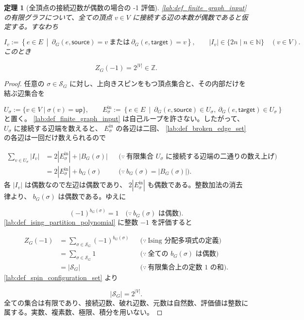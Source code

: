 \documentclass[11pt,a4paper]{article}
\newtheorem{theorem}[definition]{定理}
\theoremstyle{remark}
\begin{document}
\begin{theorem}[全頂点の接続辺数が偶数の場合の -1 評価]\label{lab:theorem_even_incident_edge_counts_evaluation_minus_one}
\cref{lab:def_finite_graph_input}
 の有限グラフについて、全ての頂点 
$v\in V$
 に接続する辺の本数が偶数であると仮定する。すなわち

\[I_v:=\left\{e\in E\ \middle|\ \partial_G(e,\mathsf{source})=v\ \text{または}\ \partial_G(e,\mathsf{target})=v\right\},\qquad |I_v|\in\{2n\mid n\in\mathbb N\}\quad(v\in V).\]
このとき

\[Z_G(-1)=2^{|V|}\in\mathbb Z.\]
\end{theorem}
\begin{proof}
任意の 
$\sigma\in\mathcal S_G$
 に対し、上向きスピンをもつ頂点集合と、その内部だけを結ぶ辺集合を

\[U_\sigma:=\{v\in V\mid \sigma(v)=\mathsf{up}\},\qquad
E_\sigma^{\mathrm{in}}:=\left\{e\in E\ \middle|\ \partial_G(e,\mathsf{source})\in U_\sigma,\ \partial_G(e,\mathsf{target})\in U_\sigma\right\}\]
と置く。
\cref{lab:def_finite_graph_input}
 は自己ループを許さない。したがって、
$U_\sigma$
 に接続する辺端を数えると、
$E_\sigma^{\mathrm{in}}$
 の各辺は二回、
\cref{lab:def_broken_edge_set}
 の各辺は一回だけ数えられるので

\[\begin{aligned}
\sum_{v\in U_\sigma}|I_v|
&=2|E_\sigma^{\mathrm{in}}|+|B_G(\sigma)|
&&\bigl(\because\ \text{有限集合 }U_\sigma\text{ に接続する辺端の二通りの数え上げ}\bigr)\\
&=2|E_\sigma^{\mathrm{in}}|+b_G(\sigma)
&&\bigl(\because\ b_G(\sigma)=|B_G(\sigma)|\bigr).
\end{aligned}\]
各 
$|I_v|$
 は偶数なので左辺は偶数であり、
$2|E_\sigma^{\mathrm{in}}|$
 も偶数である。整数加法の消去律より、
$b_G(\sigma)$
 は偶数である。ゆえに

\[(-1)^{b_G(\sigma)}=1
\quad\bigl(\because\ b_G(\sigma)\text{ は偶数}\bigr).\]
\cref{lab:def_ising_partition_polynomial}
 に整数 
$-1$
 を評価すると

\[\begin{aligned}
Z_G(-1)
&=\sum_{\sigma\in\mathcal S_G}(-1)^{b_G(\sigma)}
&&\bigl(\because\ \text{Ising 分配多項式の定義}\bigr)\\
&=\sum_{\sigma\in\mathcal S_G}1
&&\bigl(\because\ \text{全ての }b_G(\sigma)\text{ は偶数}\bigr)\\
&=|\mathcal S_G|
&&\bigl(\because\ \text{有限集合上の定数 }1\text{ の和}\bigr).
\end{aligned}\]
\cref{lab:def_spin_configuration_set}
 より

\[|\mathcal S_G|=2^{|V|}.\]
全ての集合は有限であり、接続辺数、破れ辺数、元数は自然数、評価値は整数に属する。実数、複素数、極限、積分を用いない。

\end{proof}
\end{document}
